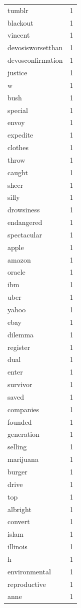 \begin{tabular}{lr}
tumblr & 1 \\
blackout & 1 \\
vincent & 1 \\
devosisworsetthan & 1 \\
devosconfirmation & 1 \\
justice & 1 \\
w & 1 \\
bush & 1 \\
special & 1 \\
envoy & 1 \\
expedite & 1 \\
clothes & 1 \\
throw & 1 \\
caught & 1 \\
sheer & 1 \\
silly & 1 \\
drowsiness & 1 \\
endangered & 1 \\
spectacular & 1 \\
apple & 1 \\
amazon & 1 \\
oracle & 1 \\
ibm & 1 \\
uber & 1 \\
yahoo & 1 \\
ebay & 1 \\
dilemma & 1 \\
register & 1 \\
dual & 1 \\
enter & 1 \\
survivor & 1 \\
saved & 1 \\
companies & 1 \\
founded & 1 \\
generation & 1 \\
selling & 1 \\
marijuana & 1 \\
burger & 1 \\
drive & 1 \\
top & 1 \\
albright & 1 \\
convert & 1 \\
islam & 1 \\
illinois & 1 \\
h & 1 \\
environmental & 1 \\
reproductive & 1 \\
anne & 1 \\

\end{tabular}

